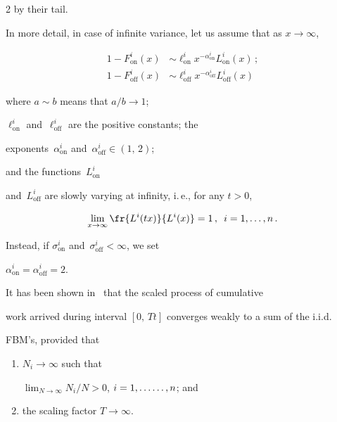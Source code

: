 \begin{multicols}{2}
 by their tail. 

In more detail, in case of infinite variance, let us assume that as $x \to \infty$,

\begin{align*}

1-F_{\mathrm{on}}^i(x)& \sim  \ell_{\mathrm{on}}^i x^{-\alpha_{\mathrm{on}}^i}L_{\mathrm{on}}^i(x)\,;\\

1-F^i_{\mathrm{off}}(x)& \sim  \ell_{\mathrm{off}}^i x^{-\alpha_{\mathrm{off}}^i}L_{\mathrm{off}}^i(x)


\end{align*}

where   $a \sim b$  means that $a/b\to 1$;    

$\ell_{\mathrm{on}}^i$ and~$\ell_{\mathrm{off}}^i$ are the positive constants; the 

exponents~$\alpha_{\mathrm{on}}^i$ and~$\alpha_{\mathrm{off}}^i\in (1,\,2)$; 

and the functions~$L_{\mathrm{on}}^i$ 

and~$L_{\mathrm{\mathrm{off}}}^i$ are slowly varying at infinity, i.\,e., for any $t >0$,

$$

\lim_{x \to \infty} \fr{L^i(tx)}{L^i(x)}=1\,,\enskip i=1,\ldots,n\,.

$$

Instead, if $\sigma_{\mathrm{on}}^i$ and~$\sigma_{\mathrm{off}}^i <\infty$, we  set 

$\alpha_{\mathrm{on}}^i=\alpha_{\mathrm{off}}^i=2$. 



It has been  shown in~\cite{4-luk-1} that the scaled process of cumulative  

work arrived during interval  $[0,\,Tt]$ converges weakly to a sum of the i.i.d.\

 FBM's,  provided that 

\begin{enumerate}[(1)]

    \item $N_i\to \infty$ such that

$\lim\nolimits_{N\to \infty}N_i/N>0$, $i=1,\ldots\linebreak \ldots , n$; and

\item  the scaling factor $T\to \infty$.

\end{enumerate}




\end{multicols}
